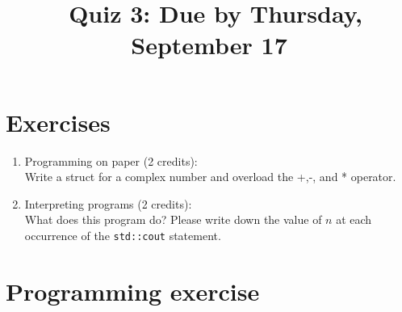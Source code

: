 \documentclass[11pt]{article}
\begin{document}
\title{\coursename~Quiz 3: Due by Thursday, September 17}
\date{}
\maketitle

\medskip


\section*{Exercises}

\begin{enumerate}
\item Programming on paper (2 credits): \\
Write a struct for a complex number and overload the +,-, and * operator.

\item Interpreting programs (2 credits): \\
What does this program do? Please write down the value of $n$ at each occurrence of the \lstinline|std::cout| statement.



\end{enumerate}

\section*{Programming exercise}
\end{document}
